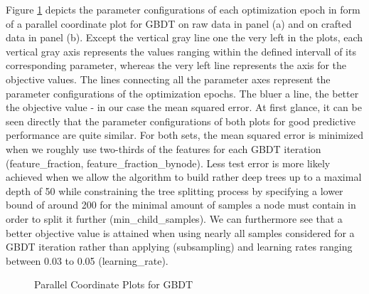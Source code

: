 Figure \ref{fig:GBDT_ParallelPlot} depicts the parameter configurations of each optimization epoch in form of a parallel coordinate plot for GBDT on raw data in panel (a) and on crafted data in panel (b). Except the vertical gray line one the very left in the plots, each vertical gray axis represents the values ranging within the defined intervall of its corresponding parameter, whereas the very left line represents the axis for the objective values. The lines connecting all the parameter axes represent the parameter configurations of the optimization epochs. The bluer a line, the better the objective value - in our case the mean squared error. 
At first glance, it can be seen directly that the parameter configurations of both plots for good predictive performance are quite similar. For both sets, the mean squared error is minimized when we roughly use two-thirds of the features for each GBDT iteration (feature\_fraction, feature\_fraction\_bynode). Less test error is more likely achieved when we allow the algorithm to build rather deep trees up to a maximal depth of 50 while constraining the tree splitting process by specifying a lower bound of around 200 for the minimal amount of samples a node must contain in order to split it further (min\_child\_samples). We can furthermore see that a better objective value is attained when using nearly all samples considered for a GBDT iteration rather than applying (subsampling) and learning rates ranging between 0.03 to 0.05 (learning\_rate).

\begin{figure}[h]
	\centering
	\caption{Parallel Coordinate Plots for GBDT}
	\label{fig:GBDT_ParallelPlot}
\end{figure}

